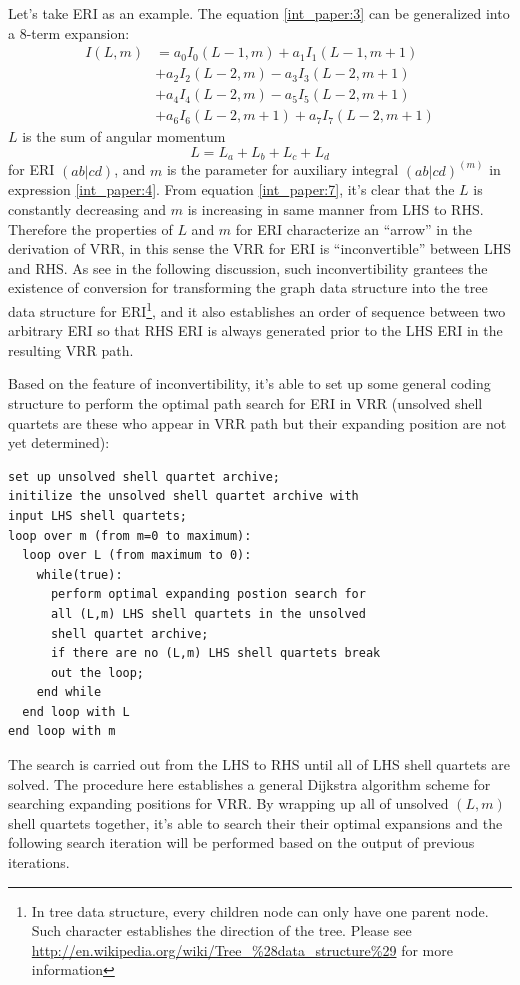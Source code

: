 Let's take ERI as an example. The equation \ref{int_paper:3} can be generalized into a 8-term 
expansion:
\begin{align}\label{int_paper:7}
I(L,m) &= a_{0}I_{0}(L-1,m) + a_{1}I_{1}(L-1,m+1) \nonumber \\ 
&+ a_{2}I_{2}(L-2,m) - a_{3}I_{3}(L-2,m+1) \nonumber \\
&+ a_{4}I_{4}(L-2,m) - a_{5}I_{5}(L-2,m+1) \nonumber \\
&+ a_{6}I_{6}(L-2,m+1) + a_{7}I_{7}(L-2,m+1)
\end{align}
$L$ is the sum of angular momentum
\begin{equation}\label{int_paper:8}
 L = L_{a} + L_{b} + L_{c} + L_{d}
\end{equation}
for ERI $(ab|cd)$, and $m$ is the parameter for auxiliary integral $(ab|cd)^{(m)}$ in 
expression \ref{int_paper:4}.
From equation \ref{int_paper:7}, it's clear that the $L$ is constantly decreasing and $m$ is
increasing in same manner from LHS to RHS. Therefore the properties of $L$ and $m$ 
for ERI characterize an ``arrow'' in the derivation of VRR, in this sense the VRR
for ERI is ``inconvertible'' between LHS and RHS. As see in the following discussion,
such inconvertibility grantees the existence of conversion for transforming the graph
data structure into the tree data structure for ERI\footnote{In tree data structure,
every children node can only have one parent node. Such character establishes the direction
of the tree. Please see \url{http://en.wikipedia.org/wiki/Tree_\%28data_structure\%29} for 
more information}, and it also establishes an order 
of sequence between two arbitrary ERI so that RHS ERI is always generated prior to
the LHS ERI in the resulting VRR path.

Based on the feature of inconvertibility, it's able to set up some general coding structure
to perform the optimal path search for ERI in VRR (unsolved shell quartets are these who
appear in VRR path but their expanding position are not yet determined):
\begin{verbatim}
set up unsolved shell quartet archive;
initilize the unsolved shell quartet archive with 
input LHS shell quartets;
loop over m (from m=0 to maximum):
  loop over L (from maximum to 0):
    while(true):
      perform optimal expanding postion search for 
      all (L,m) LHS shell quartets in the unsolved 
      shell quartet archive;
      if there are no (L,m) LHS shell quartets break 
      out the loop;
    end while
  end loop with L
end loop with m
\end{verbatim}
The search is carried out from the LHS to RHS until all of LHS shell quartets 
are solved. The procedure here establishes a general Dijkstra algorithm scheme 
for searching expanding positions for VRR. By wrapping up all of unsolved 
$(L,m)$ shell quartets together, it's able to search their their optimal expansions
and the following search iteration will be performed based on the output of
previous iterations. 

